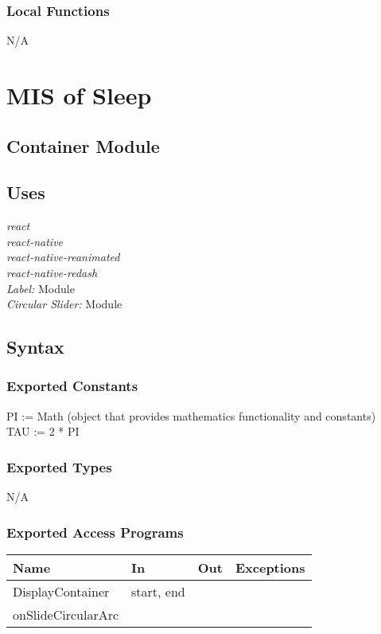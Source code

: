 \documentclass[12pt, titlepage]{article}
\begin{document}
\subsubsection{Local Functions}

N/A

\section{MIS of Sleep} \label{Module} 

\subsection{Container Module}

\subsection{Uses}
{\textit{react}}\\
{\textit{react-native}}\\
{\textit{react-native-reanimated}}\\
{\textit{react-native-redash}}\\
{\textit{Label:} Module}\\
{\textit{Circular Slider:} Module}

\subsection{Syntax}

\subsubsection{Exported Constants}
PI := Math (object that provides mathematics functionality and constants)\\
TAU := 2 * PI
\subsubsection{Exported Types}
N/A

\subsubsection{Exported Access Programs}

\begin{tabular}{| l | l | l | l |}
	\hline
	{\textbf{Name}} & {\textbf{In}} & {\textbf{Out}} & {\textbf{Exceptions}}\\
	\hline
	{DisplayContainer} & start, end & & \\
	\hline
	{onSlideCircularArc} & & & \\
	\hline
\end{tabular}
\end{document}
